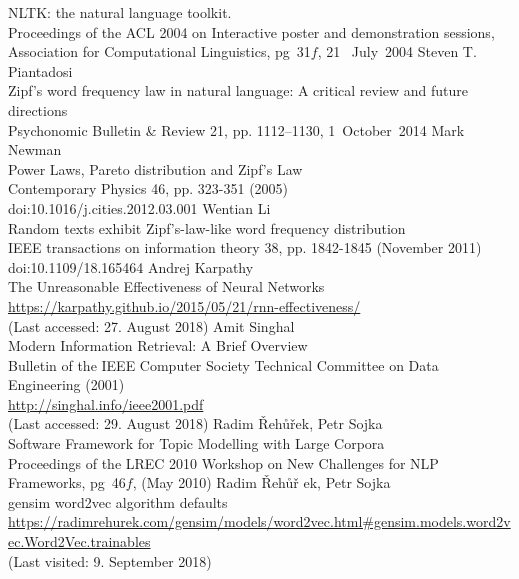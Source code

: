 \documentclass[10pt, a4paper]{UUThesisTemplate}
\begin{document}
\begin{thebibliography}{--}
    NLTK: the natural language toolkit.\\
    Proceedings of the ACL 2004 on Interactive poster and demonstration sessions, Association for Computational Linguistics, pg~31\!$f$, 21~ July~2004
     Steven T. Piantadosi\\
    Zipf's word frequency law in natural language: A critical review and future directions\\
    Psychonomic Bulletin {\&} Review 21, pp. 1112--1130, 1~October~2014
     Mark Newman\\
    Power Laws, Pareto distribution and Zipf's Law\\
    Contemporary Physics 46, pp. 323-351 (2005)\\
    doi:10.1016/j.cities.2012.03.001
     Wentian Li\\
    Random texts exhibit Zipf's-law-like word frequency distribution\\
    IEEE transactions on information theory 38, pp. 1842-1845 (November 2011)\\
    doi:10.1109/18.165464
     Andrej Karpathy\\
    The Unreasonable Effectiveness of Neural Networks\\
    \url{https://karpathy.github.io/2015/05/21/rnn-effectiveness/}\\
    (Last accessed: 27. August 2018)
     Amit Singhal\\
    Modern Information Retrieval: A Brief Overview\\
    Bulletin of the IEEE Computer Society Technical Committee on Data Engineering (2001)\\
    \url{http://singhal.info/ieee2001.pdf}\\
    (Last accessed: 29. August 2018)
    Radim {\v R}eh{\r u}{\v r}ek, Petr Sojka\\
    Software Framework for Topic Modelling with Large Corpora\\
    Proceedings of the LREC 2010 Workshop on New Challenges for NLP Frameworks, pg~46\!$f$, (May 2010)
     Radim {\v R}eh{\r u}{\v r} ek, Petr Sojka\\
    gensim word2vec algorithm defaults\\
    \url{https://radimrehurek.com/gensim/models/word2vec.html#gensim.models.word2vec.Word2Vec.trainables}\\
    (Last visited: 9. September 2018)

\end{thebibliography}
\end{document}
